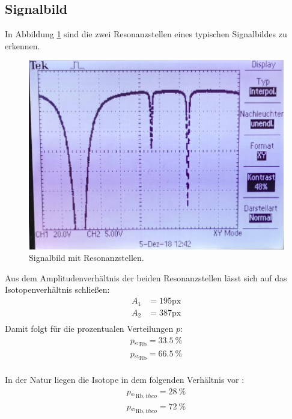 \subsection{Signalbild}
In Abbildung \ref{abb:2} sind die zwei Resonanzstellen eines typischen Signalbildes
zu erkennen.

\begin{figure}
  \centering
  \includegraphics[scale=0.3]{Foto.png}
  \caption{Signalbild mit Resonanzstellen.}
  \label{abb:2}
\end{figure}

Aus dem Amplitudenverhältnis der beiden Resonanzstellen lässt sich auf das
Isotopenverhältnis schließen:
\begin{align*}
  A_1 &= 195\text{px} \\
  A_2 &= 387\text{px} \\
\end{align*}
Damit folgt für die prozentualen Verteilungen $p$:
\begin{align*}
  p_{^{87}\text{Rb}} = \SI{33,5}{\percent} \\
  p_{^{85}\text{Rb}} = \SI{66,5}{\percent} \\
\end{align*}

In der Natur liegen die Isotope in dem folgenden Verhältnis vor : \cite{Q2}
\begin{align*}
  p_{^{87}\text{Rb}, theo} = \SI{28}{\percent} \\
  p_{^{85}\text{Rb}, theo} = \SI{72}{\percent} \\
\end{align*}

